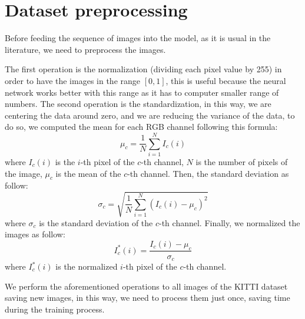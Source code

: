 \section{Dataset preprocessing}\label{sec:dataset-preprocessing}

Before feeding the sequence of images into the model, as it is usual in the literature, we need to preprocess the images.

The first operation is the normalization (dividing each pixel value by 255) in order to have the images in the range $[0,1]$, this is useful because the neural network works better with this range as it has to computer smaller range of numbers.
The second operation is the standardization, in this way, we are centering the data around zero, and we are reducing the variance of the data, to do so, we computed the mean for each RGB channel following this formula:
\begin{equation}
    \mu_{c} = \frac{1}{N}\sum_{i=1}^{N}I_{c}(i)
    \label{eq:equation_mean}
\end{equation}
where $I_{c}(i)$ is the $i$-th pixel of the $c$-th channel, $N$ is the number of pixels of the image, $\mu_{c}$ is the mean of the $c$-th channel.
Then, the standard deviation as follow:
\begin{equation}
    \sigma_{c} = \sqrt{\frac{1}{N}\sum_{i=1}^{N}(I_{c}(i) - \mu_{c})^{2}}
    \label{eq:equation_std_dev}
\end{equation}
where $\sigma_{c}$ is the standard deviation of the $c$-th channel.
Finally, we normalized the images as follow:
\begin{equation}
    I^*_{c}(i) = \frac{I_{c}(i) - \mu_{c}}{\sigma_{c}}
    \label{eq:equation_normalization}
\end{equation}
where $I^*_{c}(i)$ is the normalized $i$-th pixel of the $c$-th channel.

We perform the aforementioned operations to all images of the KITTI dataset saving new images, in this way, we need to process them just once, saving time during the training process.

